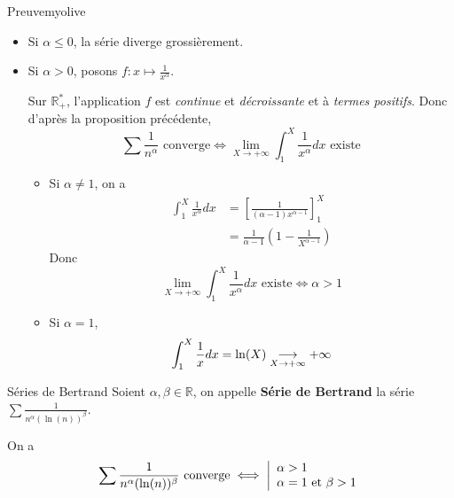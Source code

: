     \begin{demo}{Preuve}{myolive}
        \begin{itemize}
            \item Si $\alpha \leq 0$, la série diverge grossièrement.
            \item Si $\alpha > 0$, posons $f : x \longmapsto \frac{1}{x^{\alpha}}$. 
            
            Sur $\mathbb{R}_+^*$, l’application $f$ est \textit{continue} et \textit{décroissante} et à \textit{termes positifs}. Donc d’après la proposition précédente, 
            \[ \sum \frac{1}{n^{\alpha}} \text{ converge} \iff \lim_{X \rightarrow +\infty} \int_{1}^{X} \frac{1}{x^{\alpha}}dx \text{ existe} \]
            \begin{itemize}
                \item Si $\alpha \neq 1$, on a 
                \begin{align*} \int_{1}^{X} \frac{1}{x^{\alpha}}dx 
                &= \left[\frac{1}{(\alpha-1)x^{\alpha-1}}\right]_1^X \\
                &= \frac{1}{\alpha-1} \left(1 - \frac{1}{X^{\alpha-1}}\right)
                \end{align*}
                Donc 
                \[ \lim_{X \rightarrow +\infty} \int_{1}^{X} \frac{1}{x^{\alpha}}dx \text{ existe} \iff \alpha > 1 \]
                \item Si $\alpha = 1$, 
                \[ \int_{1}^{X} \frac{1}{x}dx = \ln(X) \underset{X \rightarrow +\infty}{\longrightarrow} +\infty \] 
            \end{itemize}
        \end{itemize}
    \end{demo}

    \begin{prop}{Séries de Bertrand}{}
        Soient $\alpha, \beta \in \mathbb{R}$, on appelle \textbf{Série de Bertrand} la série $\sum \frac{1}{n^{\alpha}(\ln(n))^{\beta}}$.

        On a 
        \[ \sum \frac{1}{n^{\alpha}(\ln(n))^{\beta}} \text{ converge} \iff \ou{\alpha > 1}{\alpha = 1 \text{ et } \beta > 1} \] 
    \end{prop}

